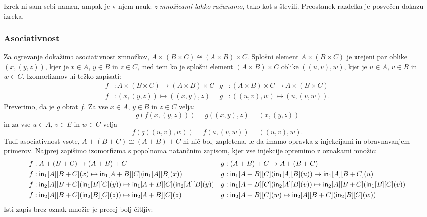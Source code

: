 Izrek ni sam sebi namen, ampak je v njem nauk: \emph{z množicami lahko računamo}, tako kot
s števili. Preostanek razdelka je posvečen dokazu izreka.

\subsubsection{Asociativnost}
\label{sec:asociativnost}

Za ogrevanje dokažimo asociativnost zmnožkov,
$A \times (B \times C) \cong (A \times B) \times C$. Splošni element
$A \times (B \times C)$ je urejeni par oblike $(x, (y, z))$, kjer je $x \in A$, $y \in B$
in $z \in C$, med tem ko je splošni element $(A \times B) \times C$ oblike $((u, v), w)$,
kjer je $u \in A$, $v \in B$ in $w \in C$. Izomorfizmov ni težko zapisati:
%
\begin{align*}
  f &:  A \times (B \times C) \to (A \times B) \times C &
  g &: (A \times B) \times C \to A \times (B \times C) \\
  f &: (x, (y, z)) \mapsto ((x, y), z) &
  g &: ((u, v), w) \mapsto (u, (v, w)).
\end{align*}
%
Preverimo, da je $g$ obrat $f$. Za vse $x \in A$, $y \in B$ in $z \in C$ velja:
%
\begin{equation*}
  g(f(x, (y, z))) = g((x, y), z) = (x, (y, z))
\end{equation*}
%
in za vse $u \in A$, $v \in B$ in $w \in C$ velja
%
\begin{equation*}
  f(g((u, v), w)) = f(u, (v, w)) = ((u, v), w).
\end{equation*}
%
Tudi asociativnost vsote, $A + (B + C) \cong (A + B) + C$ ni nič bolj zapletena, le da
imamo opravka z injekcijami in obravnavanjem primerov. Najprej zapišimo izomorfizma s
popolnoma natančnim zapisom, kjer vse injekcije opremimo z oznakami množic:
%
\begin{align*}
  f &:  A + (B + C) \to (A + B) + C &
  g &: (A + B) + C \to A + (B + C) \\
  f &: \mathsf{in}_{1}[A][B+C](x)             \mapsto \mathsf{in}_{1}[A+B][C](\mathsf{in}_{1}[A][B](x)) &
  g &: \mathsf{in}_{1}[A+B][C](\mathsf{in}_{1}[A][B](u)) \mapsto \mathsf{in}_{1}[A][B+C](u)\\
  f &: \mathsf{in}_{2}[A][B+C](\mathsf{in}_{1}[B][C](y)) \mapsto \mathsf{in}_{1}[A+B][C](\mathsf{in}_{2}[A][B](y)) &
  g &: \mathsf{in}_{1}[A+B][C](\mathsf{in}_{2}[A][B](v)) \mapsto \mathsf{in}_{2}[A][B+C](\mathsf{in}_{1}[B][C](v))  \\
  f &: \mathsf{in}_{2}[A][B+C](\mathsf{in}_{2}[B][C](z)) \mapsto \mathsf{in}_{2}[A+B][C](z) &
  g &: \mathsf{in}_{2}[A+B][C](w)              \mapsto \mathsf{in}_{2}[A][B+C](\mathsf{in}_{2}[B][C](w))
\end{align*}
%
Isti zapis brez oznak množic je precej bolj čitljiv:
